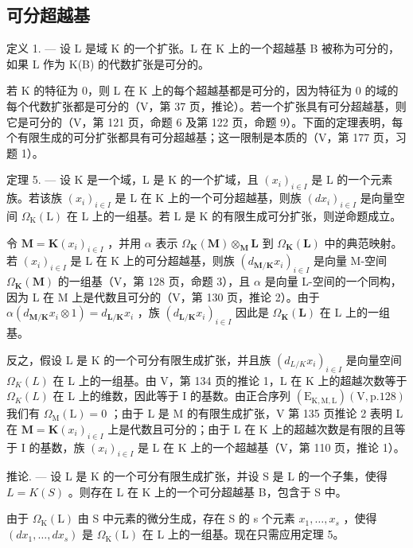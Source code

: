 \subsection{可分超越基}

定义 1. --- 设 L 是域 K 的一个扩张。L 在 K 上的一个超越基 B 被称为可分的，如果 L 作为 K(B) 的代数扩张是可分的。

若 K 的特征为 0，则 L 在 K 上的每个超越基都是可分的，因为特征为 0 的域的每个代数扩张都是可分的（V，第 37 页，推论）。若一个扩张具有可分超越基，则它是可分的（V，第 121 页，命题 6 及第 122 页，命题 9）。下面的定理表明，每个有限生成的可分扩张都具有可分超越基；这一限制是本质的（V，第 177 页，习题 1）。

定理 5. --- 设 K 是一个域，L 是 K 的一个扩域，且 \((x_{i})_{i\in I}\) 是 L 的一个元素族。若该族 \((x_{i})_{i\in I}\) 是 L 在 K 上的一个可分超越基，则族 \((dx_{i})_{i\in I}\) 是向量空间 \(\Omega_{\mathrm{K}}(\mathrm{L})\) 在 L 上的一组基。若 L 是 K 的有限生成可分扩张，则逆命题成立。

令 \(\mathbf{M} = \mathbf{K}(x_i)_{i \in I}\) ，并用 \(\alpha\) 表示 \(\Omega_{\mathbf{K}}(\mathbf{M}) \otimes_{\mathbf{M}} \mathbf{L}\) 到 \(\Omega_{\mathbf{K}}(\mathbf{L})\) 中的典范映射。若 \((x_i)_{i \in I}\) 是 L 在 K 上的可分超越基，则族 \((d_{\mathbf{M}/\mathbf{K}} x_i)_{i \in I}\) 是向量 M-空间 \(\Omega_{\mathbf{K}}(\mathbf{M})\) 的一组基（V，第 128 页，命题 3），且 \(\alpha\) 是向量 L-空间的一个同构，因为 L 在 M 上是代数且可分的（V，第 130 页，推论 2）。由于 \(\alpha(d_{\mathbf{M}/\mathbf{K}} x_i \otimes 1) = d_{\mathbf{L}/\mathbf{K}} x_i\) ，族 \((d_{\mathbf{L}/\mathbf{K}} x_i)_{i \in I}\) 因此是 \(\Omega_{\mathbf{K}}(\mathbf{L})\) 在 L 上的一组基。

反之，假设 L 是 K 的一个可分有限生成扩张，并且族 \((d_{L/K}x_{i})_{i\in I}\) 是向量空间 \(\Omega_{K}(L)\) 在 L 上的一组基。由 V，第 134 页的推论 1，L 在 K 上的超越次数等于 \(\Omega_{K}(L)\) 在 L 上的维数，因此等于 I 的基数。由正合序列 \((\mathrm{E}_{\mathrm{K},\mathrm{M},\mathrm{L}})(\mathrm{V},\mathrm{p}.128)\) 我们有 \(\Omega_{\mathrm{M}}(\mathrm{L})=0\) ；由于 L 是 M 的有限生成扩张，V 第 135 页推论 2 表明 L 在 \(\mathbf{M}=\mathbf{K}(x_{i})_{i\in I}\) 上是代数且可分的；由于 L 在 K 上的超越次数是有限的且等于 I 的基数，族 \((x_{i})_{i\in I}\) 是 L 在 K 上的一个超越基（V，第 110 页，推论 1）。

推论. --- 设 L 是 K 的一个可分有限生成扩张，并设 S 是 L 的一个子集，使得 \(L = K(S)\) 。则存在 L 在 K 上的一个可分超越基 B，包含于 S 中。

由于 \(\Omega_{\mathrm{K}}(\mathrm{L})\) 由 S 中元素的微分生成，存在 S 的 s 个元素 \(x_{1}, \ldots, x_{s}\) ，使得 \((dx_{1}, \ldots, dx_{s})\) 是 \(\Omega_{\mathrm{K}}(\mathrm{L})\) 在 L 上的一组基。现在只需应用定理 5。

